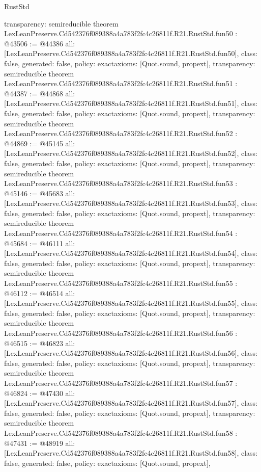 \begin{lexlean}{RustStd}
\begin{coremodule}
{  transparency: semireducible
}
theorem LexLeanPreserve.Cd542376f089388a4a783f2fc4c26811f.R21.RustStd.fun50 : @43506 := @44386 {
  all: [LexLeanPreserve.Cd542376f089388a4a783f2fc4c26811f.R21.RustStd.fun50],
  class: false,
  generated: false,
  policy: exact{axioms: [Quot.sound, propext]},
  transparency: semireducible
}
theorem LexLeanPreserve.Cd542376f089388a4a783f2fc4c26811f.R21.RustStd.fun51 : @44387 := @44868 {
  all: [LexLeanPreserve.Cd542376f089388a4a783f2fc4c26811f.R21.RustStd.fun51],
  class: false,
  generated: false,
  policy: exact{axioms: [Quot.sound, propext]},
  transparency: semireducible
}
theorem LexLeanPreserve.Cd542376f089388a4a783f2fc4c26811f.R21.RustStd.fun52 : @44869 := @45145 {
  all: [LexLeanPreserve.Cd542376f089388a4a783f2fc4c26811f.R21.RustStd.fun52],
  class: false,
  generated: false,
  policy: exact{axioms: [Quot.sound, propext]},
  transparency: semireducible
}
theorem LexLeanPreserve.Cd542376f089388a4a783f2fc4c26811f.R21.RustStd.fun53 : @45146 := @45683 {
  all: [LexLeanPreserve.Cd542376f089388a4a783f2fc4c26811f.R21.RustStd.fun53],
  class: false,
  generated: false,
  policy: exact{axioms: [Quot.sound, propext]},
  transparency: semireducible
}
theorem LexLeanPreserve.Cd542376f089388a4a783f2fc4c26811f.R21.RustStd.fun54 : @45684 := @46111 {
  all: [LexLeanPreserve.Cd542376f089388a4a783f2fc4c26811f.R21.RustStd.fun54],
  class: false,
  generated: false,
  policy: exact{axioms: [Quot.sound, propext]},
  transparency: semireducible
}
theorem LexLeanPreserve.Cd542376f089388a4a783f2fc4c26811f.R21.RustStd.fun55 : @46112 := @46514 {
  all: [LexLeanPreserve.Cd542376f089388a4a783f2fc4c26811f.R21.RustStd.fun55],
  class: false,
  generated: false,
  policy: exact{axioms: [Quot.sound, propext]},
  transparency: semireducible
}
theorem LexLeanPreserve.Cd542376f089388a4a783f2fc4c26811f.R21.RustStd.fun56 : @46515 := @46823 {
  all: [LexLeanPreserve.Cd542376f089388a4a783f2fc4c26811f.R21.RustStd.fun56],
  class: false,
  generated: false,
  policy: exact{axioms: [Quot.sound, propext]},
  transparency: semireducible
}
theorem LexLeanPreserve.Cd542376f089388a4a783f2fc4c26811f.R21.RustStd.fun57 : @46824 := @47430 {
  all: [LexLeanPreserve.Cd542376f089388a4a783f2fc4c26811f.R21.RustStd.fun57],
  class: false,
  generated: false,
  policy: exact{axioms: [Quot.sound, propext]},
  transparency: semireducible
}
theorem LexLeanPreserve.Cd542376f089388a4a783f2fc4c26811f.R21.RustStd.fun58 : @47431 := @48919 {
  all: [LexLeanPreserve.Cd542376f089388a4a783f2fc4c26811f.R21.RustStd.fun58],
  class: false,
  generated: false,
  policy: exact{axioms: [Quot.sound, propext]},
}
\end{coremodule}
\end{lexlean}
